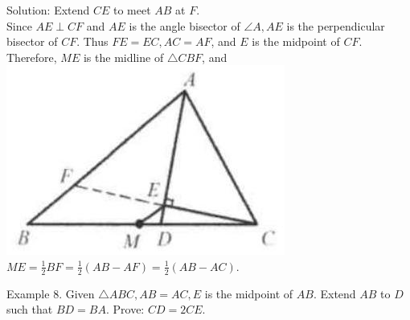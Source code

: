 \documentclass[10pt]{article}
\begin{document}
Solution:
Extend \(C E\) to meet \(A B\) at \(F\).\\
Since \(A E \perp C F\) and \(A E\) is the angle bisector of \(\angle A, A E\) is the perpendicular bisector of \(C F\). Thus \(F E=E C, A C=A F\), and \(E\) is the midpoint of \(C F\).\\
Therefore, \(M E\) is the midline of \(\triangle C B F\), and\\
\includegraphics[max width=\textwidth, center]{2025_04_17_97bc1f7e44d93c271a88g-039(3)}\\
\(M E=\frac{1}{2} B F=\frac{1}{2}(A B-A F)=\frac{1}{2}(A B-A C)\).

Example 8. Given \(\triangle A B C, A B=A C, E\) is the midpoint of \(A B\). Extend \(A B\) to \(D\) such that \(B D=B A\). Prove: \(C D=2 C E\).
\end{document}
